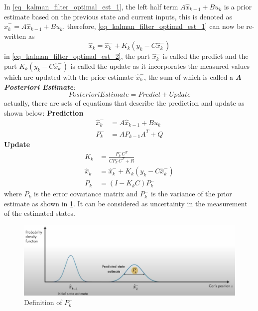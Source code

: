 In \eqref{eq_kalman_filter_optimal_est_1}, the left half term $A \hat{x}_{k-1} + B u_{k}$ is a prior estimate based on the previous state and current inputs, this is denoted as $\hat{x}^{-}_{k} = A \hat{x}_{k-1} + B u_{k}$, therefore, \eqref{eq_kalman_filter_optimal_est_1} can now be re-written as
\begin{equation}\label{eq_kalman_filter_optimal_est_2}
	\hat{x}_{k} = \hat{x}^{-}_{k} + K_{k}(y_{k} - C\hat{x}^{-}_{k})
\end{equation}
in \eqref{eq_kalman_filter_optimal_est_2}, the part $ \hat{x}^{-}_{k}$ is called the predict and the part $K_{k}(y_{k} - C\hat{x}^{-}_{k})$ is called the update as it incorporates the measured values which are updated with the prior estimate $\hat{x}^{-}_{k}$, the sum of which is called a \textbf{\textit{A Posteriori Estimate}}:
\begin{equation}
	Posteriori Estimate = Predict + Update
\end{equation}
actually, there are sets of equations that describe the prediction and update as shown below:
\textbf{Prediction}
\begin{align}
	\hat{x}^{-}_{k} &= A \hat{x}_{k-1} + B u_{k} \\
	P^{-}_{k} &= A P_{k-1}A^{T} + Q
\end{align}
\textbf{Update}
\begin{align}
	K_{k} &= \frac{P^{-}_{k} C^{T}}{C P^{-}_{k} C^{T} + R} \\
	\hat{x}_{k} &= \hat{x}^{-}_{k} + K_{k}(y_{k} - C\hat{x}^{-}_{k}) \\
	P_{k} &= (I - K_{k}C)P^{-}_{k}
\end{align}
where $P_{k}$ is the error covariance matrix and $P^{-}_{k}$ is the variance of the prior estimate as shown in \ref{fig_Px_covaraince_matrix}. It can be considered as uncertainty in the measurement of the estimated states.
\begin{figure}[h!]
	\centering
	\includegraphics[width=\linewidth]{Bilder/Px_covaraince_matrix.png}
	\caption{Definition of $P^{-}_{k}$}
	\label{fig_Px_covaraince_matrix}
\end{figure}
